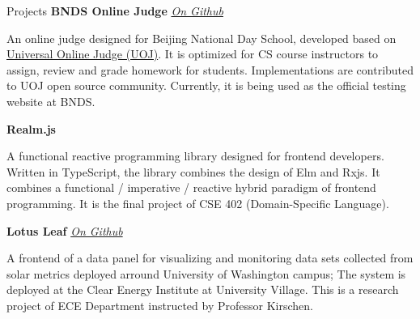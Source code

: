 \documentclass{resume}
\begin{document}
	\begin{rSection}{Projects}
		\textbf{BNDS Online Judge} \hfill {\em {\href{https://github.com/AD1024/BNDSOJ}{On Github}}}
		\vspace{-5pt}

		An online judge designed for Beijing National Day School, developed based on \href{https://github.com/vfleaking/uoj}{Universal Online Judge (UOJ)}. It is optimized for CS course instructors to assign, review and grade homework for students. Implementations are contributed to UOJ open source community. Currently, it is being used as the official testing website at BNDS.
		\vspace{-5pt}

		\textbf{Realm.js}
		\vspace{-5pt}

		A functional reactive programming library designed for frontend developers. Written in TypeScript, the library combines the design of Elm and Rxjs. It combines a functional / imperative / reactive hybrid paradigm of frontend programming. It is the final project of CSE 402 (Domain-Specific Language).
		\vspace{-5pt}

		\textbf{Lotus Leaf} \hfill {\em {\href{https://github.com/AD1024/lotus-leaf-frontend}{On Github}}}
		\vspace{-5pt}

		A frontend of a data panel for visualizing and monitoring data sets collected from solar metrics deployed arround University of Washington campus; The system is deployed at the Clear Energy Institute at University Village. This is a research project of ECE Department instructed by Professor Kirschen.


\end{rSection}
\end{document}
